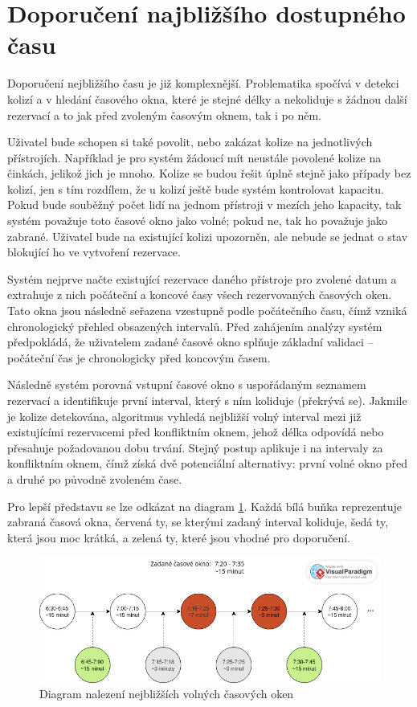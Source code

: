 \section{Doporučení najbližšího dostupného času}
Doporučení nejbližšího času je již komplexnější. Problematika spočívá v detekci kolizí a v hledání časového okna, které je stejné délky a nekoliduje s žádnou další rezervací a to jak před zvoleným časovým oknem, tak i po něm.

Uživatel bude schopen si také povolit, nebo zakázat kolize na jednotlivých přístrojích. Například je pro systém žádoucí mít neustále povolené kolize na činkách, jelikož jich je mnoho. Kolize se budou řešit úplně stejně jako případy bez kolizí, jen s tím rozdílem, že u kolizí ještě bude systém kontrolovat kapacitu. Pokud bude souběžný počet lidí na jednom přístroji v mezích jeho kapacity, tak systém považuje toto časové okno jako volné; pokud ne, tak ho považuje jako zabrané. Uživatel bude na existující kolizi upozorněn, ale nebude se jednat o stav blokující ho ve vytvoření rezervace.

Systém nejprve načte existující rezervace daného přístroje pro zvolené datum a extrahuje z nich počáteční a koncové časy všech rezervovaných časových oken. Tato okna jsou následně seřazena vzestupně podle počátečního času, čímž vzniká chronologický přehled obsazených intervalů. Před zahájením analýzy systém předpokládá, že uživatelem zadané časové okno splňuje základní validaci – počáteční čas je chronologicky před koncovým časem.

Následně systém porovná vstupní časové okno s uspořádaným seznamem rezervací a identifikuje první interval, který s ním koliduje (překrývá se). Jakmile je kolize detekována, algoritmus vyhledá nejbližší volný interval mezi již existujícími rezervacemi před konfliktním oknem, jehož délka odpovídá nebo přesahuje požadovanou dobu trvání. Stejný postup aplikuje i na intervaly za konfliktním oknem, čímž získá dvě potenciální alternativy: první volné okno před a druhé po původně zvoleném čase.

Pro lepší představu se lze odkázat na diagram \ref{fig:ReservationTimeSuggestionDiagram}. Každá bílá buňka reprezentuje zabraná časová okna, červená ty, se kterými zadaný interval koliduje, šedá ty, která jsou moc krátká, a zelená ty, které jsou vhodné pro doporučení. 

\begin{figure}
    \centering
    \includegraphics[width=1\textwidth]{Figures/time_suggestion_diagram.jpg}
    \caption{Diagram nalezení nejbližších volných časových oken}
    \label{fig:ReservationTimeSuggestionDiagram}
\end{figure}


